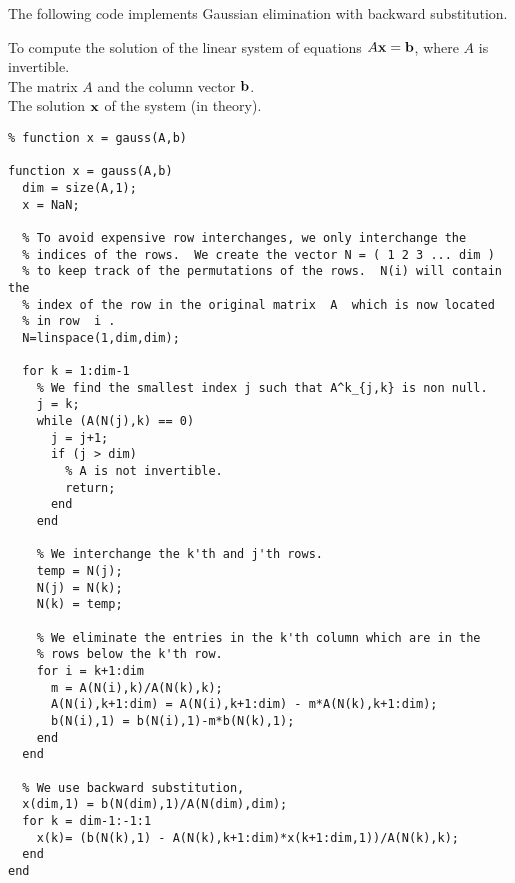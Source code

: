 The following code implements Gaussian elimination with backward
substitution.

\begin{code}
To compute the solution of the linear system of equations
$A\mathbf{x} = \mathbf{b}$, where $A$ is invertible.\\
 The matrix $A$ and the column vector $\mathbf{b}$. \\
 The solution $\mathbf{x}$ of the system (in theory).
\small
\begin{verbatim}
% function x = gauss(A,b)

function x = gauss(A,b)
  dim = size(A,1);
  x = NaN;

  % To avoid expensive row interchanges, we only interchange the
  % indices of the rows.  We create the vector N = ( 1 2 3 ... dim )
  % to keep track of the permutations of the rows.  N(i) will contain the
  % index of the row in the original matrix  A  which is now located
  % in row  i .
  N=linspace(1,dim,dim);

  for k = 1:dim-1
    % We find the smallest index j such that A^k_{j,k} is non null.
    j = k;
    while (A(N(j),k) == 0)
      j = j+1;
      if (j > dim)
        % A is not invertible.
        return;
      end
    end

    % We interchange the k'th and j'th rows.
    temp = N(j);
    N(j) = N(k);
    N(k) = temp;

    % We eliminate the entries in the k'th column which are in the
    % rows below the k'th row.
    for i = k+1:dim
      m = A(N(i),k)/A(N(k),k);
      A(N(i),k+1:dim) = A(N(i),k+1:dim) - m*A(N(k),k+1:dim);
      b(N(i),1) = b(N(i),1)-m*b(N(k),1);
    end
  end

  % We use backward substitution,
  x(dim,1) = b(N(dim),1)/A(N(dim),dim);
  for k = dim-1:-1:1
    x(k)= (b(N(k),1) - A(N(k),k+1:dim)*x(k+1:dim,1))/A(N(k),k);
  end
end
\end{verbatim}
\end{code}

